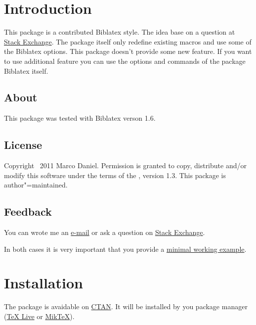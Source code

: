 \documentclass[english]{ltxdockit}[2011/03/25]
\newcommand*{\biblatex}{Biblatex\xspace}
\begin{document}
\printtitlepage
\tableofcontents


\section{Introduction}
\label{int}

This package is a contributed \biblatex style. The idea base on a question at \href{http://tex.stackexchange.com/questions/26891/biblatex-style-file-for-new-england-journal-of-medicine-nejm/26894#26894}{Stack Exchange}. The package itself only redefine existing macros and use some of the \biblatex options. This package doesn't provide some new feature. If you want to use additional feature you can use the options and commands of the package \biblatex itself. 

\subsection[About]{About }
\label{int:abt}

This package was tested with \biblatex verson 1.6.


\subsection{License}
Copyright \textcopyright\ 2011 Marco Daniel. Permission is granted to copy, distribute and\slash or modify this software under the terms of the \lppl, version 1.3. This package is author"=maintained.

\subsection{Feedback}
\label{int:feb}

You can wrote me an \href{mailto:marco.daniel@mada-nada.de}{e-mail} or ask a question on \href{http://tex.stackexchange.com}{Stack Exchange}. 

In both cases it is very important that you provide a \href{http://www.minimalbeispiel.de/mini-en.html}{minimal working example}.

\section{Installation}
\label{inst}

The package is avaidable on \href{http://www.ctan.org}{CTAN}. It will be installed by you package manager (\href{http://www.tug.org/texlive}{TeX Live} or \href{http://www.miktex.org}{MikTeX}).
\end{document}

